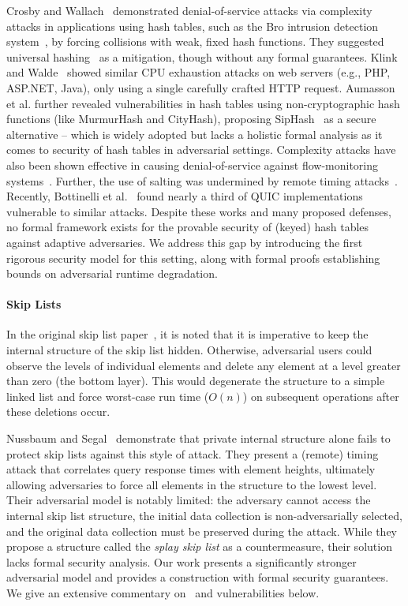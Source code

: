 Crosby and Wallach~\cite{CrosbyW03} demonstrated denial-of-service attacks via complexity attacks in applications using hash tables, such as the Bro intrusion detection system~\cite{paxson1999bro}, by forcing collisions with weak, fixed hash functions. They suggested universal hashing~\cite{carter1977universal} as a mitigation, though without any formal guarantees. Klink and Walde~\cite{klink2011efficient} showed similar CPU exhaustion attacks on web servers (e.g., PHP, ASP.NET, Java), only using a single carefully crafted HTTP request. Aumasson et al.\cite{aumasson2012hash} further revealed vulnerabilities in hash tables using non-cryptographic hash functions (like MurmurHash and CityHash\cite{appleby2016smhasher}), proposing SipHash~\cite{aumasson2012hash} as a secure alternative -- which is widely adopted but lacks a holistic formal analysis as it comes to security of hash tables in adversarial settings. Complexity attacks have also been shown effective in causing denial-of-service against flow-monitoring systems~\cite{eckhoff2009hash}. Further, the use of salting was undermined by remote timing attacks~\cite{bar2007remote}. Recently, Bottinelli et al.~\cite{bottinelli2025hash} found nearly a third of QUIC implementations vulnerable to similar attacks. Despite these works and many proposed defenses, no formal framework exists for the provable security of (keyed) hash tables against adaptive adversaries. We address this gap by introducing the first rigorous security model for this setting, along with formal proofs establishing bounds on adversarial runtime degradation.

\paragraph{Skip Lists}
In the original skip list paper~\cite{pugh}, it is noted that it is imperative to keep the internal structure of the skip list hidden. Otherwise, adversarial users could observe the levels of individual elements and delete any element at a level greater than zero (the bottom layer). This would degenerate the structure to a simple linked list and force worst-case run time ($O(n)$) on subsequent operations after these deletions occur. 

Nussbaum and Segal~\cite{nussbaum2019skiplist} demonstrate that private internal structure alone fails to protect skip lists against this style of attack. They present a (remote) timing attack that correlates query response times with element heights, ultimately allowing adversaries to force all elements in the structure to the lowest level. Their adversarial model is notably limited: the adversary cannot access the internal skip list structure, the initial data collection is non-adversarially selected, and the original data collection must be preserved during the attack. While they propose a structure called the \emph{splay skip list} as a countermeasure, their solution lacks formal security analysis. Our work presents a significantly stronger adversarial model and provides a construction with formal security guarantees. We give an extensive commentary on~\cite{nussbaum2019skiplist} and vulnerabilities below. 

